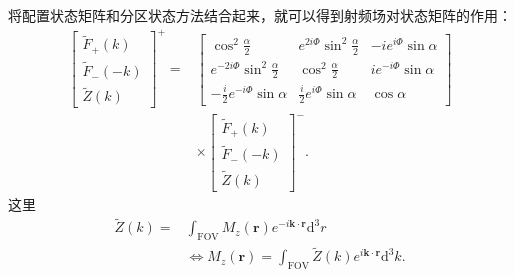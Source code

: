 将配置状态矩阵和分区状态方法结合起来，就可以得到射频场对状态矩阵的作用：
 \begin{align}
 \left[
  \begin{matrix}
   \tilde{F}_+(k) \\
   \tilde{F}_-(-k) \\
   \tilde{Z}(k)
   \end{matrix}
   \right]^+
   =&
   \left[
  \begin{matrix}
   \cos^2\frac{\alpha}{2} & e^{2i\Phi}\sin^2\frac{\alpha}{2} & -ie^{i\Phi}\sin\alpha \\
   e^{-2i\Phi}\sin^2\frac{\alpha}{2} & \cos^2\frac{\alpha}{2} & ie^{-i\Phi}\sin\alpha \\
   -\frac{i}{2}e^{-i\Phi}\sin\alpha & \frac{i}{2}e^{i\Phi}\sin\alpha & \cos\alpha
   \end{matrix}
   \right]\nonumber \\
   & \times \left[
  \begin{matrix}
   \tilde{F}_+(k) \\
   \tilde{F}_-(-k) \\
   \tilde{Z}(k)
   \end{matrix}
   \right]^-.
 \end{align}
 这里
 \begin{align} 
 \tilde{Z}(k)=&\int_{\mathrm{FOV}}M_z(\textbf{r})e^{-i\textbf{k} \cdot \textbf{r}}\mathrm{d}^3r\nonumber\\ &\Longleftrightarrow
 M_z(\textbf{r})=\int_{\mathrm{FOV}}\tilde{Z}(k)e^{i\textbf{k} \cdot \textbf{r}}\mathrm{d}^3k.
 \end{align}
 
